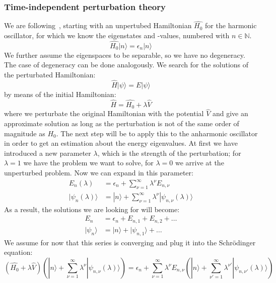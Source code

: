 \subsubsection{Time-independent perturbation theory}
We are following~\cite{fliessbach2008quantenmechanik}, starting with 
an unpertubed Hamiltonian $\hat{H_0}$ for the harmonic oscillator, 
for which we know the 
eigenstates and -values, numbered with $n\in \mathbb{N}$. 
\begin{equation}
\hat{H_0} |n\rangle = \epsilon_n |n\rangle 
\end{equation}
We further assume the eigenspaces to be
separable, so we have no degeneracy. The case of degeneracy
can be done analogously. 
We search for the solutions of the perturbated Hamiltonian:
\begin{equation}
    \hat{H}|\psi \rangle = E|\psi \rangle 
\end{equation}
by means of the initial Hamiltonian:
\begin{equation}
    \hat{H} = \hat{H_0} + \lambda \hat{V}
\end{equation}
where we perturbate the original Hamiltonian with the potential
$\hat{V}$ and give an approximate solution as long as the perturbation
is not of the same order of magnitude as $H_0$. 
The next step will be to apply this to the anharmonic 
oscillator in order to get an estimation about the energy eigenvalues.
At first we have introduced a new parameter $\lambda$, which is the 
strength of the perturbation; for $\lambda = 1$ we have the problem
we want to solve, for $\lambda = 0 $ we arrive at the unperturbed
problem. Now we can expand in this parameter:
\begin{align}
    E_n(\lambda) &= \epsilon_n + \sum_{\nu =1}^{\infty} \lambda^\nu
    E_{n,\nu} \\ 
    |\psi_n(\lambda)\rangle &=
    |n\rangle + \sum_{\nu =1}^{\infty} \lambda^\nu
    |\psi_{n,\nu}(\lambda)\rangle
\end{align}
As a result, the solutions we are looking for will become:
\begin{align}
    E_n &= \epsilon_n + E_{n,1} + E_{n,2} + \ldots\\ 
    |\psi_n \rangle &= |n\rangle + |\psi_{n,1} \rangle + \ldots 
\end{align}
We assume for now that this series is converging and plug it into
the Schrödinger equation:
\begin{equation}
    (\hat{H_0} + \lambda \hat{V})
   \left( |n\rangle + \sum_{\nu =1}^{\infty} \lambda^\nu
        |\psi_{n,\nu}(\lambda)\rangle \right) =
\epsilon_n + \sum_{\nu =1}^{\infty} \lambda^\nu
    E_{n,\nu}  
    \left( |n\rangle + \sum_{\nu' =1}^{\infty} \lambda^{\nu'}
        |\psi_{n,\nu'}(\lambda)\rangle \right) 
\end{equation}
